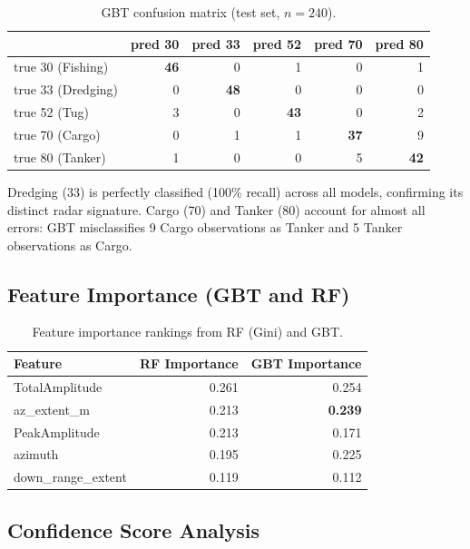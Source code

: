 \documentclass[journal]{IEEEtran}
\begin{document}
\begin{table}[H]
\centering
\caption{GBT confusion matrix (test set, $n=240$).}
\label{tab:cm_gbt}
\begin{tabular}{lrrrrr}
\toprule
 & \textbf{pred 30} & \textbf{pred 33} & \textbf{pred 52}
 & \textbf{pred 70} & \textbf{pred 80} \\
\midrule
true 30 (Fishing)  & \textbf{46} & 0 & 1 & 0 & 1 \\
true 33 (Dredging) & 0 & \textbf{48} & 0 & 0 & 0 \\
true 52 (Tug)      & 3 & 0 & \textbf{43} & 0 & 2 \\
true 70 (Cargo)    & 0 & 1 & 1 & \textbf{37} & 9 \\
true 80 (Tanker)   & 1 & 0 & 0 & 5 & \textbf{42} \\
\bottomrule
\end{tabular}
\end{table}

\noindent Dredging (33) is perfectly classified (100\% recall) across all models,
confirming its distinct radar signature.
Cargo (70) and Tanker (80) account for almost all errors: GBT misclassifies
9 Cargo observations as Tanker and 5 Tanker observations as Cargo.

\subsection{Feature Importance (GBT and RF)}

\begin{table}[H]
\centering
\caption{Feature importance rankings from RF (Gini) and GBT.}
\begin{tabular}{lrr}
\toprule
\textbf{Feature} & \textbf{RF Importance} & \textbf{GBT Importance} \\
\midrule
TotalAmplitude      & 0.261 & 0.254 \\
az\_extent\_m       & 0.213 & \textbf{0.239} \\
PeakAmplitude       & 0.213 & 0.171 \\
azimuth             & 0.195 & 0.225 \\
down\_range\_extent & 0.119 & 0.112 \\
\bottomrule
\end{tabular}
\end{table}

\subsection{Confidence Score Analysis}
\end{document}
